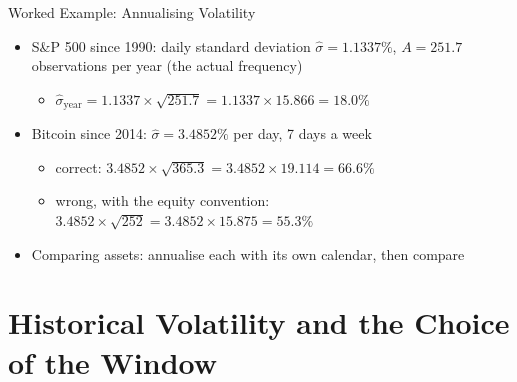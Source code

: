 \begin{frame}{Worked Example: Annualising Volatility}
\itemsize{\small}
\begin{itemize}
    \item S\&P 500 since 1990: daily standard deviation $\hat\sigma = 1.1337\%$, $A = 251.7$ observations per year (the actual frequency)
    \begin{itemize}
        \item $\hat\sigma_{\text{year}} = 1.1337 \times \sqrt{251.7} = 1.1337 \times 15.866 = 18.0\%$
    \end{itemize}
    \item Bitcoin since 2014: $\hat\sigma = 3.4852\%$ per day, 7 days a week
    \begin{itemize}
        \item correct: $3.4852 \times \sqrt{365.3} = 3.4852 \times 19.114 = 66.6\%$
        \item wrong, with the equity convention: $3.4852 \times \sqrt{252} = 3.4852 \times 15.875 = 55.3\%$
    \end{itemize}
    \item Comparing assets: annualise each with its own calendar, then compare
\end{itemize}
\end{frame}


\section{Historical Volatility and the Choice of the Window}

